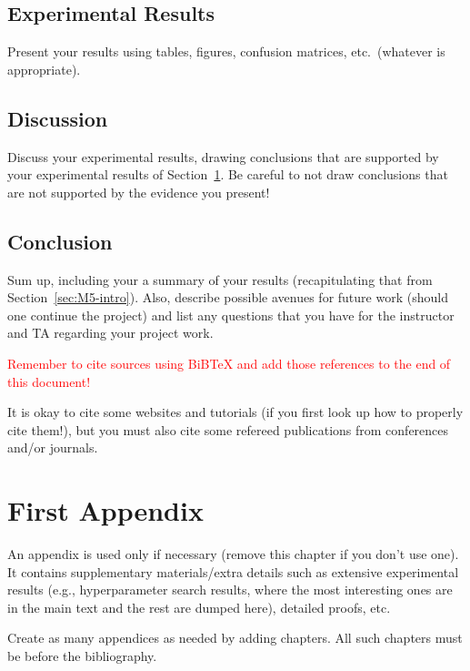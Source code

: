 \documentclass{report}
\begin{document}
\section{Experimental Results}
\label{sec:M5-results}

Present your results  using tables, figures, confusion matrices, etc.\ (whatever is appropriate). 

\section{Discussion}

Discuss your experimental results, drawing conclusions that are supported by your experimental results of Section~\ref{sec:M5-results}.   Be careful to not draw conclusions that are not supported by the evidence you present!

\section{Conclusion}

Sum up, including your a summary of your results  (recapitulating that from Section~\ref{sec:M5-intro}).  Also, describe possible avenues for future work (should one continue the project) and list any questions that you have for the instructor and TA regarding your project work.

\textcolor{red}{Remember to cite sources using BiBTeX and add those references to the end of this document!}

It is okay to cite some websites and tutorials (if you first look up how to properly cite them!), but you must also cite some refereed publications from conferences and/or journals.

\appendix

\chapter{First Appendix}

An appendix is used only if necessary (remove this chapter if you don't use one). It contains supplementary materials/extra details such as extensive experimental results (e.g., hyperparameter search results, where the most interesting ones are in the main text and the rest are dumped here), detailed proofs, etc. 

Create as many appendices as needed by adding chapters. All such chapters must be before the bibliography. 




\end{document}
